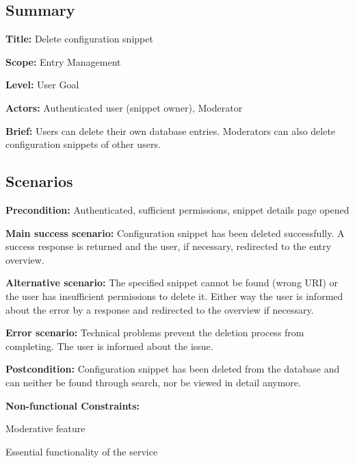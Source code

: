 \subsection*{Summary}


\begin{DoxyItemize}
\item {\bfseries Title\+:} Delete configuration snippet
\item {\bfseries Scope\+:} Entry Management
\item {\bfseries Level\+:} User Goal
\item {\bfseries Actors\+:} Authenticated user (snippet owner), Moderator
\item {\bfseries Brief\+:} Users can delete their own database entries. Moderators can also delete configuration snippets of other users.
\end{DoxyItemize}

\subsection*{Scenarios}


\begin{DoxyItemize}
\item {\bfseries Precondition\+:} Authenticated, sufficient permissions, snippet details page opened
\item {\bfseries Main success scenario\+:} Configuration snippet has been deleted successfully. A success response is returned and the user, if necessary, redirected to the entry overview.
\item {\bfseries Alternative scenario\+:} The specified snippet cannot be found (wrong U\+RI) or the user has insufficient permissions to delete it. Either way the user is informed about the error by a response and redirected to the overview if necessary.
\item {\bfseries Error scenario\+:} Technical problems prevent the deletion process from completing. The user is informed about the issue.
\item {\bfseries Postcondition\+:} Configuration snippet has been deleted from the database and can neither be found through search, nor be viewed in detail anymore.
\item {\bfseries Non-\/functional Constraints\+:}
\begin{DoxyItemize}
\item Moderative feature
\item Essential functionality of the service 
\end{DoxyItemize}
\end{DoxyItemize}